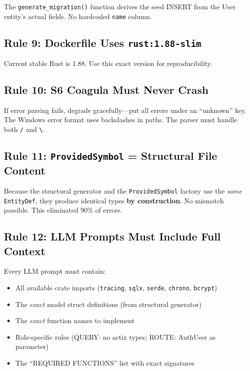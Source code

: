 \documentclass[11pt,a4paper]{article}
\begin{document}
The \texttt{generate\_migration()} function derives the seed INSERT from the User
entity's actual fields. No hardcoded \texttt{name} column.

\subsection{Rule 9: Dockerfile Uses \texttt{rust:1.88-slim}}

Current stable Rust is 1.88. Use this exact version for reproducibility.

\subsection{Rule 10: S6 Coagula Must Never Crash}

If error parsing fails, degrade gracefully---put all errors under an ``unknown'' key.
The Windows error format uses backslashes in paths. The parser must handle both
\texttt{/} and \texttt{\textbackslash}.

\subsection{Rule 11: \texttt{ProvidedSymbol} = Structural File Content}

Because the structural generator and the \texttt{ProvidedSymbol} factory use the
\emph{same} \texttt{EntityDef}, they produce identical types \textbf{by construction}.
No mismatch possible. This eliminated 90\% of errors.

\subsection{Rule 12: LLM Prompts Must Include Full Context}

Every LLM prompt must contain:
\begin{itemize}[nosep]
\item All available crate imports (\texttt{tracing}, \texttt{sqlx}, \texttt{serde}, \texttt{chrono}, \texttt{bcrypt})
\item The \emph{exact} model struct definitions (from structural generator)
\item The \emph{exact} function names to implement
\item Role-specific rules (QUERY: no actix types; ROUTE: AuthUser as parameter)
\item The ``REQUIRED FUNCTIONS'' list with exact signatures
\end{itemize}
\end{document}
